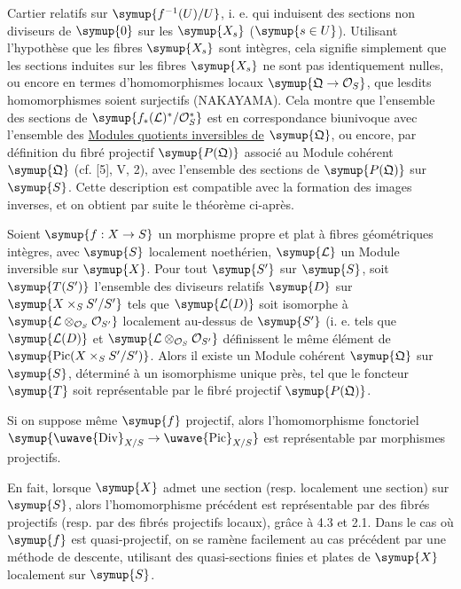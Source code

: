 Cartier relatifs sur $\symup{f^{-1}(U)/U}$, i. e. qui induisent des sections non
diviseurs de $\symup{0}$ sur les $\symup{X_s}$ ($\symup{s\in U}$). Utilisant l'hypothèse que les
fibres $\symup{X_s}$ sont intègres, cela signifie simplement que les sections induites
sur les fibres $\symup{X_s}$ ne sont pas identiquement nulles, ou encore en termes
d'homomorphismes locaux $\symup{\mathfrak Q\to\mathcal O_S}$, que lesdits
homomorphismes soient surjectifs (NAKAYAMA). Cela montre que l'ensemble des
sections de $\symup{f_*(\mathcal L)^*/\mathcal O_S^*}$ est en correspondance
biunivoque avec l'ensemble des \uline{Modules quotients inversibles de} $\symup{\mathfrak Q}$,
ou encore, par définition du fibré projectif $\symup{P(\mathfrak Q)}$ associé au
Module cohérent $\symup{\mathfrak Q}$ (cf. [5], V, 2), avec l'ensemble des sections de
$\symup{P(\mathfrak Q)}$ sur $\symup{S}$. Cette description est compatible avec la
formation des images inverses, et on obtient par suite le théorème ci-après.

 Soient $\symup{f:X\to S}$ un morphisme propre et
plat à fibres géométriques intègres, avec $\symup{S}$ localement noethérien,
$\symup{\mathcal L}$ un Module inversible sur $\symup{X}$. Pour tout $\symup{S'}$ sur $\symup{S}$, soit
$\symup{T(S')}$ l'ensemble des diviseurs relatifs $\symup{D}$ sur $\symup{X\times_SS'/S'}$ tels que
$\symup{\mathcal L(D)}$ soit isomorphe à
$\symup{\mathcal L\otimes_{\mathcal O_S}\mathcal O_{S'}}$ localement au-dessus de $\symup{S'}$
(i. e. tels que $\symup{\mathcal L(D)}$ et
$\symup{\mathcal L\otimes_{\mathcal O_S}\mathcal O_{S'}}$ définissent le même élément
de $\symup{\operatorname{Pic}(X\times_SS'/S')}$. Alors il existe un Module cohérent
$\symup{\mathfrak Q}$ sur $\symup{S}$, déterminé à un isomorphisme unique près, tel que le
foncteur $\symup{T}$ soit représentable par le fibré projectif $\symup{P(\mathfrak Q)}$.

 Si on suppose même $\symup{f}$ projectif, alors
l'homomorphisme fonctoriel
$\symup{\text{\uwave{Div}}_{X/S}\to\text{\uwave{Pic}}_{X/S}}$ est
représentable par morphismes projectifs.

En fait, lorsque $\symup{X}$ admet une section (resp. localement une section) sur $\symup{S}$,
alors l'homomorphisme précédent est représentable par des fibrés projectifs
(resp. par des fibrés projectifs locaux), grâce à 4.3 et 2.1. Dans le cas où
$\symup{f}$ est quasi-projectif, on se ramène facilement au cas précédent par une
méthode de descente, utilisant des quasi-sections finies et plates de $\symup{X}$
localement sur $\symup{S}$.


